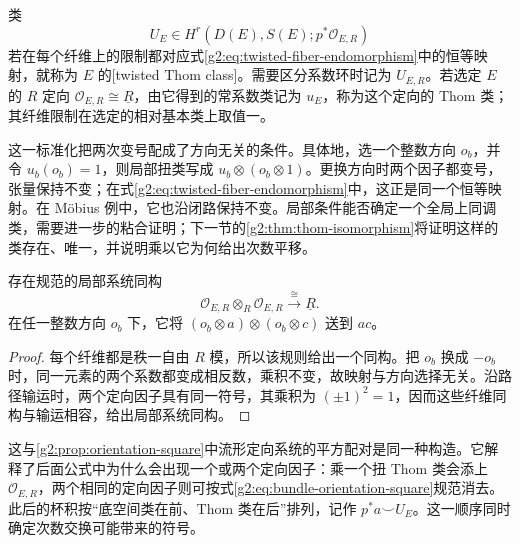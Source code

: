 \begin{definition}\label{g2:def:twisted-thom-class}
	类
	\[
		U_E\in H^r(D(E),S(E);p^*\mathcal O_{E,R})
	\]
	若在每个纤维上的限制都对应式\eqref{g2:eq:twisted-fiber-endomorphism}中的恒等映射，就称为 \(E\) 的[twisted Thom class]。需要区分系数环时记为 \(U_{E,R}\)。若选定 \(E\) 的 \(R\) 定向 \(\mathcal O_{E,R}\cong\underline R\)，由它得到的常系数类记为 \(u_E\)，称为这个定向的 Thom 类；其纤维限制在选定的相对基本类上取值一。
\end{definition}

这一标准化把两次变号配成了方向无关的条件。具体地，选一个整数方向 \(o_b\)，并令 \(u_b(o_b)=1\)，则局部扭类写成 \(u_b\otimes(o_b\otimes1)\)。更换方向时两个因子都变号，张量保持不变；在式\eqref{g2:eq:twisted-fiber-endomorphism}中，这正是同一个恒等映射。在 Möbius 例中，它也沿闭路保持不变。局部条件能否确定一个全局上同调类，需要进一步的粘合证明；下一节的\cref{g2:thm:thom-isomorphism}将证明这样的类存在、唯一，并说明乘以它为何给出次数平移。

\begin{proposition}\label{g2:prop:bundle-orientation-square}
	存在规范的局部系统同构
	\begin{equation}\label{g2:eq:bundle-orientation-square}
		\mathcal O_{E,R}\otimes_R\mathcal O_{E,R}\xrightarrow{\ \cong\ }\underline R.
	\end{equation}
	在任一整数方向 \(o_b\) 下，它将 \((o_b\otimes a)\otimes(o_b\otimes c)\) 送到 \(ac\)。
\end{proposition}
\begin{proof}
	每个纤维都是秩一自由 \(R\) 模，所以该规则给出一个同构。把 \(o_b\) 换成 \(-o_b\) 时，同一元素的两个系数都变成相反数，乘积不变，故映射与方向选择无关。沿路径输运时，两个定向因子具有同一符号，其乘积为 \((\pm1)^2=1\)，因而这些纤维同构与输运相容，给出局部系统同构。
\end{proof}

这与\cref{g2:prop:orientation-square}中流形定向系统的平方配对是同一种构造。它解释了后面公式中为什么会出现一个或两个定向因子：乘一个扭 Thom 类会添上 \(\mathcal O_{E,R}\)，两个相同的定向因子则可按式\eqref{g2:eq:bundle-orientation-square}规范消去。此后的杯积按“底空间类在前、Thom 类在后”排列，记作 \(p^*a\smile U_E\)。这一顺序同时确定次数交换可能带来的符号。
